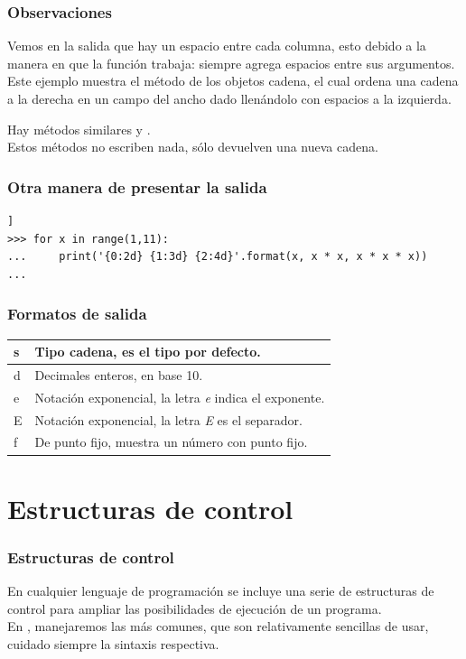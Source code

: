 \begin{frame}
\frametitle{Observaciones}
Vemos en la salida que hay un espacio entre cada columna, esto debido a la manera en que la función  trabaja: siempre agrega espacios entre sus argumentos.
\\
\bigskip
\pause
Este ejemplo muestra el método  de los objetos cadena, el cual ordena una cadena a la derecha en un campo del ancho dado llenándolo con espacios a la izquierda. 
\end{frame}
\begin{frame}
Hay métodos similares  y  .
\\
\bigskip
Estos métodos no escriben nada, sólo devuelven una nueva cadena.
\end{frame}	
\begin{frame}[fragile]
\frametitle{Otra manera de presentar la salida}
\begin{lstlisting}[numbers=none, basicstyle=\linespread{1.2}\ttfamily\small, columns=fullflexible]]
>>> for x in range(1,11):
...     print('{0:2d} {1:3d} {2:4d}'.format(x, x * x, x * x * x))
...
\end{lstlisting}
\end{frame}
\begin{frame}
\frametitle{Formatos de salida}
\begin{table}
\fontsize{12}{12}\selectfont
\begin{tabular}{l | l}
s & Tipo cadena, es el tipo por defecto. \\ \hline
d & Decimales enteros, en base 10. \\ \hline
e & Notación exponencial, la letra \emph{e} indica el exponente. \\ \hline
E & Notación exponencial, la letra \emph{E} es el separador. \\ \hline
f & De punto fijo, muestra un número con punto fijo.
\end{tabular}
\end{table}
\end{frame}
\section{Estructuras de control}
\begin{frame}
\frametitle{Estructuras de control}
En cualquier lenguaje de programación se incluye una serie de estructuras de control para ampliar las posibilidades de ejecución de un programa.
\\
\bigskip
En \python, manejaremos las más comunes, que son relativamente sencillas de usar, cuidado siempre la sintaxis respectiva.
\end{frame}
